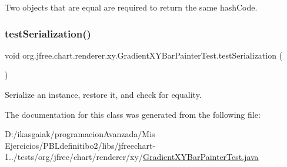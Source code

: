 Two objects that are equal are required to return the same hash\+Code. \mbox{\label{classorg_1_1jfree_1_1chart_1_1renderer_1_1xy_1_1_gradient_x_y_bar_painter_test_a4a97419689ebae501e58d6b9ad001b61}} 
\subsubsection{\texorpdfstring{test\+Serialization()}{testSerialization()}}
{\footnotesize\ttfamily void org.\+jfree.\+chart.\+renderer.\+xy.\+Gradient\+X\+Y\+Bar\+Painter\+Test.\+test\+Serialization (\begin{DoxyParamCaption}{ }\end{DoxyParamCaption})}

Serialize an instance, restore it, and check for equality. 

The documentation for this class was generated from the following file\+:\begin{DoxyCompactItemize}
\item 
D\+:/ikasgaiak/programacion\+Avanzada/\+Mis Ejercicios/\+P\+B\+Ldefinitibo2/libs/jfreechart-\/1../tests/org/jfree/chart/renderer/xy/\mbox{\hyperlink{_gradient_x_y_bar_painter_test_8java}{Gradient\+X\+Y\+Bar\+Painter\+Test.\+java}}\end{DoxyCompactItemize}
